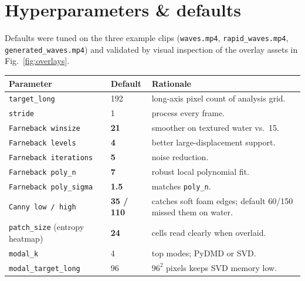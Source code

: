 \documentclass[11pt,a4paper]{article}
\newcommand{\code}[1]{\texttt{\small #1}}
\begin{document}
\section{Hyperparameters \& defaults}\label{sec:hp}

Defaults were tuned on the three example clips
(\texttt{waves.mp4}, \texttt{rapid\_waves.mp4},
\texttt{generated\_waves.mp4}) and validated by visual inspection of the
overlay assets in Fig.~\ref{fig:overlays}.

\begin{table}[ht]
\centering
\small
\renewcommand{\arraystretch}{1.18}
\setlength{\tabcolsep}{8pt}
\begin{tabular}{@{}lll@{}}
\toprule
\textbf{Parameter}                       & \textbf{Default}        & \textbf{Rationale}                      \\
\midrule
\code{target\_long}                      & 192                     & long-axis pixel count of analysis grid.  \\
\code{stride}                            & 1                       & process every frame.                     \\
\code{Farneback winsize}                 & \textbf{21}              & smoother on textured water vs.\ 15.      \\
\code{Farneback levels}                  & \textbf{4}               & better large-displacement support.       \\
\code{Farneback iterations}              & \textbf{5}               & noise reduction.                         \\
\code{Farneback poly\_n}                 & \textbf{7}               & robust local polynomial fit.             \\
\code{Farneback poly\_sigma}             & \textbf{1.5}             & matches \code{poly\_n}.                  \\
\code{Canny low / high}                  & \textbf{35 / 110}        & catches soft foam edges; default 60/150 missed them on water. \\
\code{patch\_size} (entropy heatmap)     & \textbf{24}              & cells read clearly when overlaid.        \\
\code{modal\_k}                          & 4                       & top modes; PyDMD or SVD.                 \\
\code{modal\_target\_long}               & 96                      & $96^2$ pixels keeps SVD memory low.      \\

\end{tabular}
\end{table}
\end{document}
